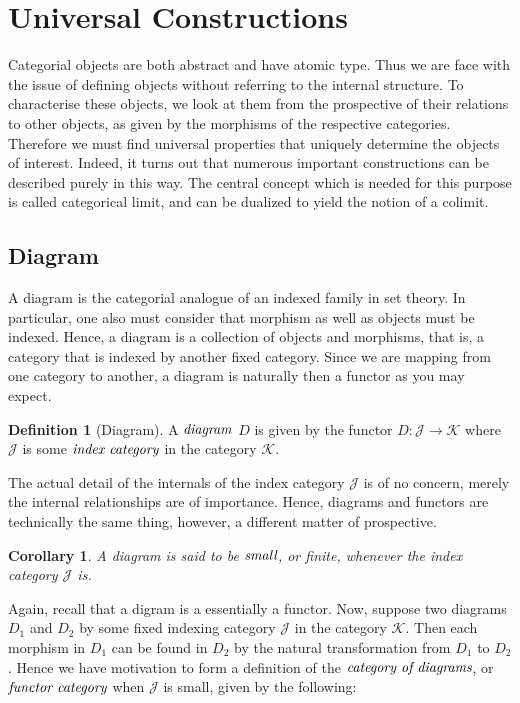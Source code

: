 \documentclass[10pt, oneside, reqno]{amsart}
\theoremstyle{plain}%
\newtheorem*{cor}{Corollary}
\theoremstyle{definition}
\newtheorem{defn}[thm]{Definition}
\theoremstyle{remark}
\begin{document}
\section{Universal Constructions} %
\label{sec:universalconstructions}
Categorial objects are both abstract and have atomic type.
Thus we are face with the issue of defining objects without referring to the internal structure.
To characterise these objects, we look at them from the prospective of their relations to other objects, as given by the morphisms 
of the respective categories. Therefore we must find universal properties that uniquely determine the objects of interest.
Indeed, it turns out that numerous important constructions can be described purely in this way.
The central concept which is needed for this purpose is called categorical limit, and can be dualized to yield the notion of a colimit.

\subsection{Diagram} %
\label{subsec:diagram}
A diagram is the categorial analogue of an indexed family in set theory. In particular, one also must consider that
morphism as well as objects must be indexed. Hence, a diagram is a collection of objects and morphisms, that is,
a category that is indexed by another fixed category. Since we are mapping from one category to another, a diagram is
naturally then a functor as you may expect.
\begin{defn}[Diagram]
 A $\emph{diagram}$ $D$ is given by the functor $D: \mathcal{J} \to \mathcal{K}$
 where $\mathcal{J}$ is some $\emph{index category}$ in the category $\mathcal{K}$.
\end{defn}

The actual detail of the internals of the index category $\mathcal{J}$ is of no concern, merely the internal relationships
are of importance. Hence, diagrams and functors are technically the same thing, however, a different matter of prospective.

\begin{cor}
 A diagram is said to be $\emph{small}$, or finite, whenever the index category $\mathcal{J}$ is.
\end{cor}

Again, recall that a digram is a essentially a functor.
Now, suppose two diagrams $D_{1}$ and $D_{2}$ by some fixed indexing category $\mathcal{J}$ in the category $\mathcal{K}$.
Then each morphism in $D_{1}$ can be found in $D_{2}$ by the natural transformation from $D_{1}$ to $D_{2}$.
Hence we have motivation to form a definition of the $\emph{category of diagrams}$, or $\emph{functor category}$ when
$\mathcal{J}$ is small, given by the following:
\end{document}
